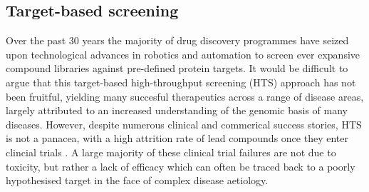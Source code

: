 \documentclass[a4paper,11pt,twoside,openright]{scrbook}
\begin{document}


\subsection{Target-based screening}
Over the past 30 years the majority of drug discovery programmes have seized upon technological advances in robotics and automation to screen ever expansive compound libraries against pre-defined protein targets.
It would be difficult to argue that this target-based high-throughput screening (HTS) approach has not been fruitful, yielding many succesful therapeutics across a range of disease areas, largely attributed to an increased understanding of the genomic basis of many diseases.
However, despite numerous clinical and commerical success stories, HTS is not a panacea, with a high attrition rate of lead compounds once they enter clincial trials \cite{citation_needed}.
A large majority of these clinical trial failures are not due to toxicity, but rather a lack of efficacy which can often be traced back to a poorly hypothesised target in the face of complex disease aetiology.
\end{document}
